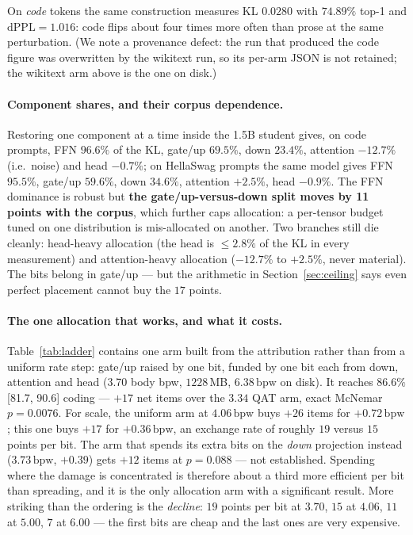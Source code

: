 \documentclass[11pt,a4paper]{article}
\newcommand{\bpw}{\,\mathrm{bpw}}
\begin{document}
On \emph{code} tokens the same construction measures KL $0.0280$ with $74.89\%$ top-1 and
$\mathrm{dPPL}=1.016$: code flips about four times more often than prose at the same perturbation.
(We note a provenance defect: the run that produced the code figure was overwritten by the
wikitext run, so its per-arm JSON is not retained; the wikitext arm above is the one on disk.)

\paragraph{Component shares, and their corpus dependence.} Restoring one component at a time
inside the 1.5B student gives, on code prompts, FFN $96.6\%$ of the KL, gate/up $69.5\%$, down
$23.4\%$, attention $-12.7\%$ (i.e.\ noise) and head $-0.7\%$; on HellaSwag prompts the same
model gives FFN $95.5\%$, gate/up $59.6\%$, down $34.6\%$, attention $+2.5\%$, head $-0.9\%$.
The FFN dominance is robust but \textbf{the gate/up-versus-down split moves by 11 points with the
corpus}, which further caps allocation: a per-tensor budget tuned on one distribution is
mis-allocated on another. Two branches still die cleanly: head-heavy allocation (the head is
$\le2.8\%$ of the KL in every measurement) and attention-heavy allocation ($-12.7\%$ to $+2.5\%$,
never material). The bits belong in gate/up --- but the arithmetic in Section~\ref{sec:ceiling}
says even perfect placement cannot buy the $17$ points.

\paragraph{The one allocation that works, and what it costs.} Table~\ref{tab:ladder} contains one
arm built from the attribution rather than from a uniform rate step: gate/up raised by one bit,
funded by one bit each from down, attention and head (3.70 body bpw, $1228$\,MB, $6.38\bpw$ on
disk). It reaches $86.6\%$ [81.7, 90.6] coding --- $+17$ net items over the $3.34$ QAT arm, exact
McNemar $p=0.0076$. For scale, the uniform arm at $4.06\bpw$ buys $+26$ items for $+0.72\bpw$;
this one buys $+17$ for $+0.36\bpw$, an exchange rate of roughly $19$ versus $15$ points per bit.
The arm that spends its extra bits on the \emph{down} projection instead ($3.73\bpw$, $+0.39$) gets
$+12$ items at $p=0.088$ --- not established. Spending where the damage is concentrated is
therefore about a third more efficient per bit than spreading, and it is the only allocation arm
with a significant result. More striking than the ordering is the \emph{decline}: $19$ points per
bit at $3.70$, $15$ at $4.06$, $11$ at $5.00$, $7$ at $6.00$ --- the first bits are cheap and the
last ones are very expensive.
\end{document}
